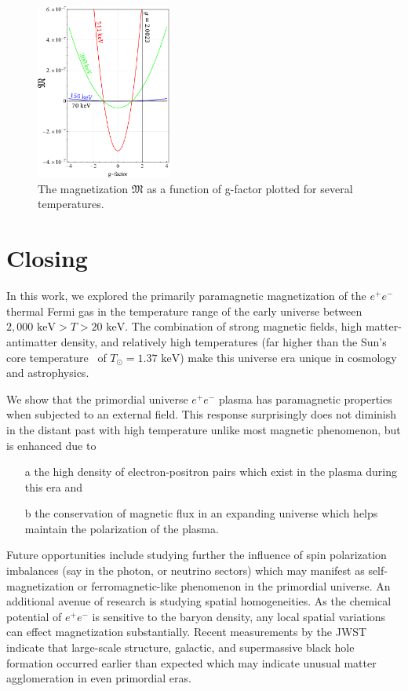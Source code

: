 \documentclass[reprint]{revtex4-2}
\newcommand*{\keV}{\text{ keV}}
\begin{document}
\begin{figure}[ht]
    \centering
    \includegraphics[width=0.4\textwidth]{plots/GFactor_03.png}
    \caption{The magnetization $\mathfrak M$ as a function of g-factor plotted for several temperatures.}
    \label{fig:gfac} 
\end{figure}

\section{Closing}
\label{sec:conclusions}
\noindent In this work, we explored the primarily paramagnetic magnetization of the $e^{+}e^{-}$ thermal Fermi gas in the temperature range of the early universe between $2,000\keV>T>20\keV$. The combination of strong magnetic fields, high matter-antimatter density, and relatively high temperatures (far higher than the Sun's core temperature~\cite{bahcall2001solar} of $T_{\odot}=1.37\keV$) make this universe era unique in cosmology and astrophysics.

We show that the primordial universe $e^{+}e^{-}$ plasma has paramagnetic properties when subjected to an external field. This response surprisingly does not diminish in the distant past with high temperature unlike most magnetic phenomenon, but is enhanced due to
\begin{itemize}
    \item[a] the high density of electron-positron pairs which exist in the plasma during this era and
    \item[b] the conservation of magnetic flux in an expanding universe which helps maintain the polarization of the plasma.
\end{itemize}

Future opportunities include studying further the influence of spin polarization imbalances (say in the photon, or neutrino sectors) which may manifest as self-magnetization or ferromagnetic-like phenomenon in the primordial universe. An additional avenue of research is studying spatial homogeneities. As the chemical potential of $e^{+}e^{-}$ is sensitive to the baryon density, any local spatial variations can effect magnetization substantially. Recent measurements by the JWST indicate that large-scale structure, galactic, and supermassive black hole formation occurred earlier than expected which may indicate unusual matter agglomeration in even primordial eras.



\end{document}
